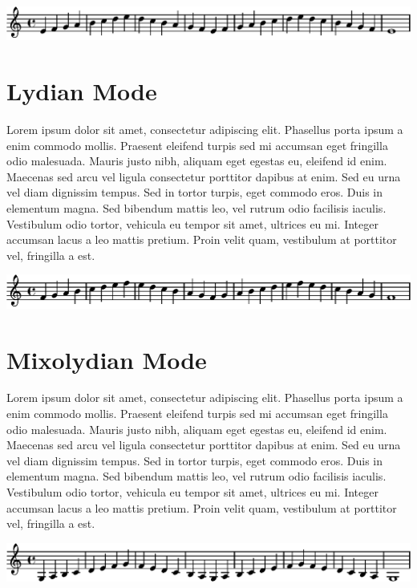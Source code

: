 \documentclass[11pt]{article}
\begin{document}
\includegraphics[width=17cm]{phrygian.eps}
\section*{Lydian Mode}
\label{sec-4}

Lorem ipsum dolor sit amet, consectetur adipiscing elit. Phasellus porta ipsum a enim commodo mollis. Praesent eleifend turpis sed mi accumsan eget fringilla odio malesuada. Mauris justo nibh, aliquam eget egestas eu, eleifend id enim. Maecenas sed arcu vel ligula consectetur porttitor dapibus at enim. Sed eu urna vel diam dignissim tempus. Sed in tortor turpis, eget commodo eros. Duis in elementum magna. Sed bibendum mattis leo, vel rutrum odio facilisis iaculis. Vestibulum odio tortor, vehicula eu tempor sit amet, ultrices eu mi. Integer accumsan lacus a leo mattis pretium. Proin velit quam, vestibulum at porttitor vel, fringilla a est.
\linebreak


\includegraphics[width=17cm]{lydian.eps}
\section*{Mixolydian Mode}
\label{sec-5}

Lorem ipsum dolor sit amet, consectetur adipiscing elit. Phasellus porta ipsum a enim commodo mollis. Praesent eleifend turpis sed mi accumsan eget fringilla odio malesuada. Mauris justo nibh, aliquam eget egestas eu, eleifend id enim. Maecenas sed arcu vel ligula consectetur porttitor dapibus at enim. Sed eu urna vel diam dignissim tempus. Sed in tortor turpis, eget commodo eros. Duis in elementum magna. Sed bibendum mattis leo, vel rutrum odio facilisis iaculis. Vestibulum odio tortor, vehicula eu tempor sit amet, ultrices eu mi. Integer accumsan lacus a leo mattis pretium. Proin velit quam, vestibulum at porttitor vel, fringilla a est.
\linebreak


\includegraphics[width=17cm]{mixolydian.eps}
\end{document}
